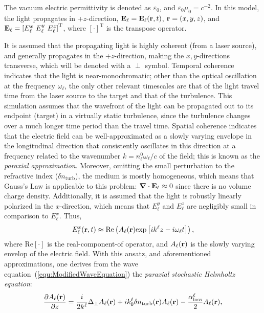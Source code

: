 \documentclass[9pt,twocolumn,twoside]{osajnl}
\newcommand{\la}[1]{\label{#1}}
\newcommand{\pp}[2]{\frac{\partial #1}{\partial #2}}
\newcommand{\bfnabla}{\boldsymbol\nabla}
\begin{document}
The vacuum electric permittivity is denoted as $\varepsilon_{0}$, and 
$\varepsilon_{0} \mu_{0} = c^{-2}$.   
In this model, the light propagates in +$z$-direction, ${\bf E}_{\ell} = {\bf 
E}_{\ell}({\bf r},t)$, ${\bf r} = (x,y,z)$, and ${\bf E}_{\ell} = 
\left[ E_{\ell}^{x} \ E_{\ell}^{y} \ E_{\ell}^{z} 
\right]^{\text{T}}$, where $[\cdot]^{\text{T}}$ is the transpose operator.  

It is assumed that the propagating light is highly coherent (from a laser 
source), and generally propagates in the +$z$-direction, making the 
$x,y$-directions transverse, which will be denoted with a $\perp$ symbol.  
Temporal coherence indicates that the light is near-monochromatic; other than 
the optical oscillation at the frequency $\omega_{\ell}$, the only other 
relevant timescales are that of the light travel time from the laser source 
to the target and that of the turbulence.  
This simulation assumes that the wavefront of the light can be propagated out 
to its endpoint (target) in a virtually static turbulence, since the turbulence 
changes over a much longer time period than the travel time.  
Spatial coherence indicates that the electric field can be well-approximated as 
a slowly varying envelope in the longitudinal direction that 
consistently oscillates in this direction at a frequency related to the 
wavenumber $k = n_{\ell}^{0}\omega_{\ell} / c$ of the field; this is known as 
the {\em paraxial approximation}.  
Moreover, omitting the small perturbation to the refractive index ($\delta n_{\text{turb}}$), 
the medium is mostly homogeneous, which means that Gauss's Law is applicable 
to this problem: $\bfnabla \cdot {\bf E}_{\ell} \approx 0$ since there is no volume charge density.
Additionally, it is assumed that the light is robustly linearly polarized in 
the $x$-direction, which means that $E_{\ell}^{y}$ and $E_{\ell}^{z}$ are 
negligibly small in comparison to $E_{\ell}^{x}$.  
Thus, 
\[
E_{\ell}^{x}({\bf r},t) \approx \text{Re}\left( A_{\ell}({\bf r}) \text{exp}\left[ ik^{\ell}z - i\omega_{\ell}t \right] \right),
\]
where Re$[\cdot]$ is the real-component-of operator, and $A_{\ell}({\bf r})$ 
is the slowly varying envelop of the electric field.  
With this ansatz, and aforementioned approximations, one derives from the wave equation~(\ref{equ:ModifiedWaveEquation}) the {\em paraxial stochastic 
Helmholtz equation}:
\begin{equation}\la{equ:ParaxialStochasticHelmholtz}
\pp{A_{\ell}({\bf r})}{z} = \frac{i}{2k^{\ell}} 
\Delta_{\perp} A_{\ell}({\bf r}) + i k_{0}^{\ell} \delta n_{\text{turb}}({\bf 
r}) A_{\ell}({\bf r}) - \frac{\alpha_{\text{loss}}^{\ell}}{2} A_{\ell}({\bf r}),
\end{equation}
\end{document}
